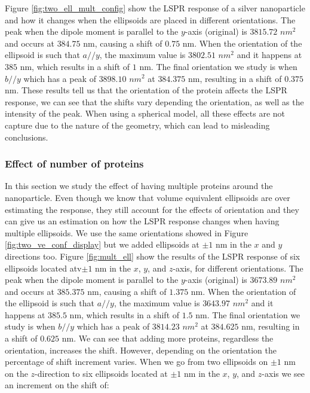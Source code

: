 Figure \ref{fig:two_ell_mult_config} show the LSPR response of a silver nanoparticle and how it changes when the ellipsoids 
are placed in different orientations. The peak when the dipole moment is parallel to the $y$-axis (original)
is $3815.72$ $nm^2$ and occurs at $384.75$ nm, causing a shift of $0.75$ nm. When the orientation of the ellipsoid 
is such that $a//y$, the maximum value is $3802.51$ $nm^2$ and it happens at $385$ nm, which results in a shift of 
$1$ nm. The final orientation we study is when $b//y$ which has a peak of $3898.10$ $nm^2$ at $384.375$ nm, resulting 
in a shift of $0.375$ nm. These results tell us that the orientation of the protein affects the LSPR response, we can 
see that the shifts vary depending the orientation, as well as the intensity of the peak. When using a spherical model, 
all these effects are not capture due to the nature of the geometry, which can lead to misleading conclusions.

\subsubsection{Effect of number of proteins}

In this section we study the effect of having multiple proteins around the nanoparticle. Even though we know 
that volume equivalent ellipsoids are over estimating the response, they still account for the effects of 
orientation and they can give us an estimation on how the LSPR response changes when having multiple 
ellipsoids. We use the same orientations showed in Figure \ref{fig:two_ve_conf_display} but we added ellipsoids 
at $\pm 1$ nm in the $x$ and $y$ directions too. Figure \ref{fig:mult_ell} show the results of the LSPR response 
of six ellipsoids located atv$\pm 1$ nm in the $x$, $y$, and $z$-axis, for different orientations. The peak when the dipole 
moment is parallel to the $y$-axis (original) is $3673.89$ $nm^2$ and occurs at $385.375$ nm, causing a shift of 
$1.375$ nm. When the orientation of the ellipsoid is such that $a//y$, the maximum value is $3643.97$ $nm^2$ and it
happens at $385.5$ nm, which results in a shift of $1.5$ nm. The final orientation we study is when $b//y$ which 
has a peak of $3814.23$ $nm^2$ at $384.625$ nm, resulting in a shift of $0.625$ nm. We can see that adding more proteins, 
regardless the orientation, increases the shift. However, depending on the orientation the percentage of shift increment 
varies. When we go from two ellipsoids on $\pm 1$ nm on the $z$-direction to six ellipsoids located at 
$\pm 1$ nm in the $x$, $y$, and $z$-axis we see an increment on the shift of:

